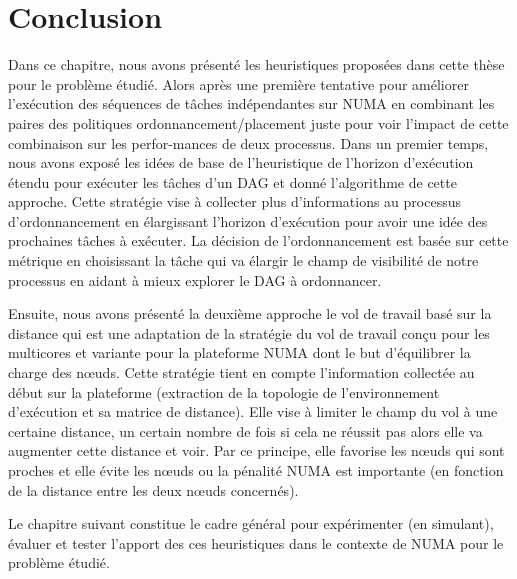 \newpage
\section{Conclusion}\label{conc}
%
Dans ce chapitre, nous avons présenté les heuristiques proposées dans cette thèse pour le problème étudié. Alors après une première tentative pour améliorer l'exécution des séquences de tâches indépendantes sur NUMA en combinant les paires des politiques ordonnancement/placement juste pour voir l'impact de cette combinaison sur les perfor-mances de deux processus. Dans un premier temps, nous avons exposé les idées de base de l'heuristique de l'horizon d'exécution étendu pour exécuter les tâches d'un DAG et donné l'algorithme de cette approche. Cette stratégie vise à collecter plus d'informations au processus d'ordonnancement en élargissant l'horizon d'exécution pour avoir une idée des prochaines tâches à exécuter. La décision de l'ordonnancement est basée sur cette métrique en choisissant la tâche qui va élargir le champ de visibilité de notre processus en aidant à mieux explorer le DAG à ordonnancer. 

Ensuite, nous avons présenté la deuxième approche le vol de travail basé sur la distance qui est une adaptation de la stratégie du vol de travail conçu pour les multicores et variante pour la plateforme NUMA dont le but d'équilibrer la charge des nœuds. Cette stratégie tient en compte l'information collectée au début sur la plateforme (extraction de la topologie de l'environnement d'exécution et sa matrice de distance). Elle vise à limiter le champ du vol à une certaine distance, un certain nombre de fois si cela ne réussit pas alors elle va augmenter cette distance et voir. Par ce principe, elle favorise les nœuds qui sont proches et elle évite les nœuds ou la pénalité NUMA est importante (en fonction de la distance entre les deux nœuds concernés).
 
Le chapitre suivant constitue le cadre général pour expérimenter (en simulant), évaluer et tester l'apport des ces heuristiques dans le contexte de NUMA pour le problème étudié.